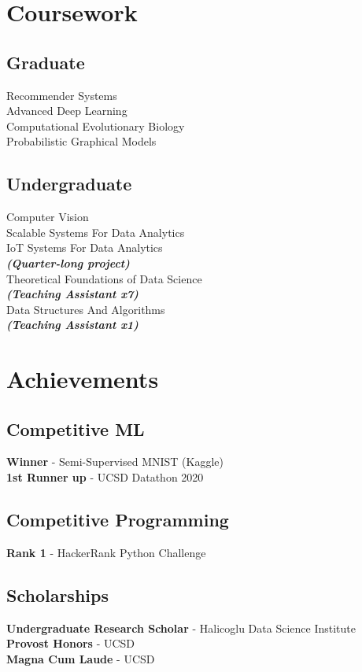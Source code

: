 \documentclass[]{devanshu-resume-openfont}
\begin{document}
\begin{minipage}[t]{0.33\textwidth}
\section{Coursework}
\subsection{Graduate}
Recommender Systems\\
Advanced Deep Learning\\
Computational Evolutionary Biology\\
Probabilistic Graphical Models\\
\sectionsep

\subsection{Undergraduate}
Computer Vision\\
Scalable Systems For Data Analytics\\
IoT Systems For Data Analytics\\
{\footnotesize \textit{\textbf{(Quarter-long project) }}} \\
Theoretical Foundations of Data Science\\
{\footnotesize \textit{\textbf{(Teaching Assistant x7) }}} \\
Data Structures And Algorithms\\
{\footnotesize \textit{\textbf{(Teaching Assistant x1) }}} \\

\sectionsep

\section{Achievements}
\subsection{Competitive ML}
\textbf{Winner} - Semi-Supervised MNIST (Kaggle)\\
\textbf{1st Runner up} - UCSD Datathon 2020\\

\sectionsep
\subsection{Competitive Programming}
\textbf{Rank 1} - HackerRank Python Challenge

\sectionsep
\subsection{Scholarships}
\textbf{Undergraduate Research Scholar} - Halicoglu Data Science Institute\\
\textbf{Provost Honors} - UCSD\\
\textbf{Magna Cum Laude} - UCSD


\end{minipage}
\end{document}
